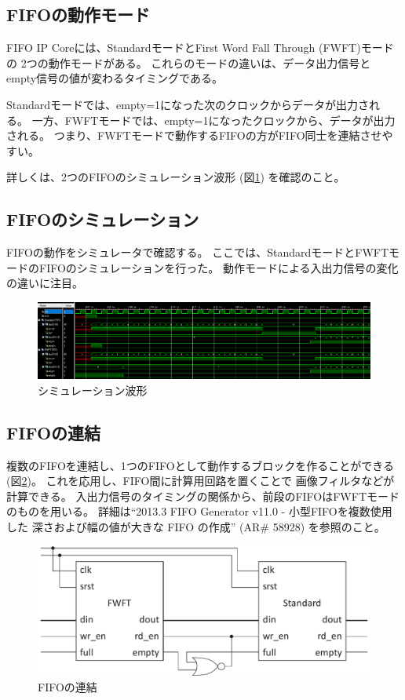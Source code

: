 \documentclass[11pt]{jsarticle}
\begin{document}
\subsection*{FIFOの動作モード}
FIFO IP Coreには、StandardモードとFirst Word Fall Through (FWFT)モードの
2つの動作モードがある。
これらのモードの違いは、データ出力信号と
empty信号の値が変わるタイミングである。

Standardモードでは、empty=1になった次のクロックからデータが出力される。
一方、FWFTモードでは、empty=1になったクロックから、データが出力される。
つまり、FWFTモードで動作するFIFOの方がFIFO同士を連結させやすい。

詳しくは、2つのFIFOのシミュレーション波形
(図\ref{img:cmp_fifo}) を確認のこと。

\subsection*{FIFOのシミュレーション}
FIFOの動作をシミュレータで確認する。
ここでは、StandardモードとFWFTモードのFIFOのシミュレーションを行った。
動作モードによる入出力信号の変化の違いに注目。

\begin{figure}[ht]
	\centering
	\includegraphics[width=\linewidth]{img/cmp_fifo.PNG}
	\caption{シミュレーション波形}
	\label{img:cmp_fifo}
\end{figure}

\vspace{-1cm}

\subsection*{FIFOの連結}
複数のFIFOを連結し、1つのFIFOとして動作するブロックを作ることができる
(図\ref{img:fifo_join})。
これを応用し、FIFO間に計算用回路を置くことで
画像フィルタなどが計算できる。
入出力信号のタイミングの関係から、前段のFIFOはFWFTモードのものを用いる。
詳細は``2013.3 FIFO Generator v11.0 - 小型FIFOを複数使用した
深さおよび幅の値が大きな FIFO の作成'' (AR\# 58928) を参照のこと。

\begin{figure}[ht]
	\centering
	\includegraphics[width=0.5\linewidth]{img/fifo_join.pdf}
	\caption{FIFOの連結}
	\label{img:fifo_join}
\end{figure}
\end{document}
